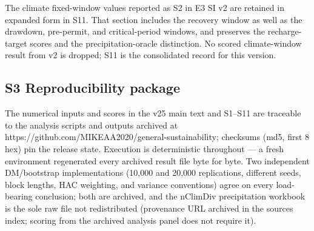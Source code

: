 \documentclass[11pt]{article}
\begin{document}
The climate fixed-window values reported as S2 in E3 SI v2 are retained in expanded form in S11. That section includes the recovery window as well as the drawdown, pre-permit, and critical-period windows, and preserves the recharge-target scores and the precipitation-oracle distinction. No scored climate-window result from v2 is dropped; S11 is the consolidated record for this version.

\subsection{S3 Reproducibility
package}\label{s3-reproducibility-package}

The numerical inputs and scores in the v25 main text and S1--S11 are
traceable to the analysis scripts and outputs archived at
https://github.com/MIKEAA2020/general-sustainability; checksums (md5,
first 8 hex) pin the release state. Execution is deterministic
throughout --- a fresh environment regenerated every archived result
file byte for byte. Two independent DM/bootstrap implementations (10,000
and 20,000 replications, different seeds, block lengths, HAC weighting,
and variance conventions) agree on every load-bearing conclusion; both
are archived, and the nClimDiv precipitation workbook is the sole raw
file not redistributed (provenance URL archived in the sources index;
scoring from the archived analysis panel does not require it).
\end{document}
